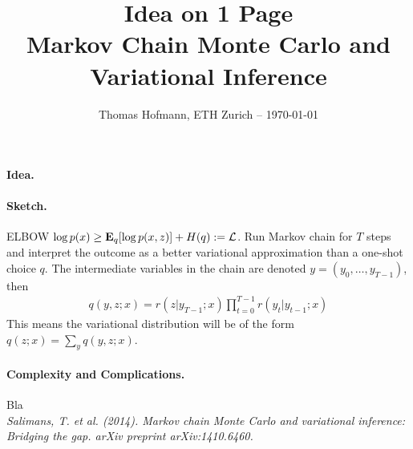 \documentclass{article}
\title{{\large Idea on {\LARGE 1} Page} \\ Markov Chain Monte Carlo and \\ Variational Inference}
\author{Thomas Hofmann, ETH Zurich -- \today}
\date{}
\newcommand{\E}{{\bf E}}
\newcommand{\loglike}{{\mathcal L}}
\begin{document}
\maketitle 

\paragraph*{Idea.} 
\paragraph*{Sketch.} ELBOW $\log p(x) \geq \E_q [\log p(x,z)] + H(q) := \loglike$. Run Markov chain for $T$ steps and interpret the outcome as a better variational approximation than a one-shot choice $q$. The intermediate variables in the chain are denoted $y=(y_0,\dots,y_{T-1})$, then 
\begin{align}
q(y,z; x) = r(z|y_{T-1};x ) \prod_{t=0}^{T-1} r(y_t|y_{t-1};x) 
\end{align}
This means the variational distribution will be of the form $q(z; x) = \sum_{y}  q(y,z;x)$. 

\paragraph*{Complexity and Complications.} Bla \\[5mm]

\textit{Salimans, T. et al. (2014). Markov chain Monte Carlo and variational inference: Bridging the gap. arXiv preprint arXiv:1410.6460.}
\end{document}
